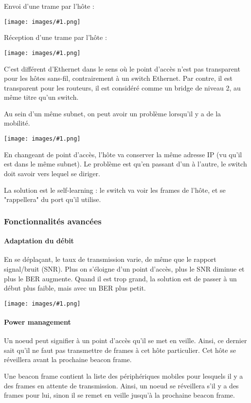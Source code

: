 \documentclass[10pt,a4paper]{report}
\newcommand{\dessin}[1]{\begin{center}\texttt{[image: images/\#1.png]}\end{center}}
\newcommand{\dessinS}[2]{\begin{center}\texttt{[image: images/\#1.png]}\end{center}}
\begin{document}
		
		Envoi d'une trame par l'hôte :
		
		\dessin{39}
		
		Réception d'une trame par l'hôte :
		
		\dessin{40}
		
		C'est différent d'Ethernet dans le sens où le point d'accès n'est pas transparent pour les hôtes sans-fil, contrairement à un switch Ethernet. Par contre, il est transparent pour les routeurs, il est considéré comme un bridge de niveau 2, au même titre qu'un switch.
		
		Au sein d'un même subnet, on peut avoir un problème lorsqu'il y a de la mobilité.
		
		\dessinS{42}{.7}
				
		En changeant de point d'accès, l'hôte va conserver la même adresse IP (vu qu'il est dans le même subnet). Le problème est qu'en passant d'un à l'autre, le switch doit savoir vers lequel se diriger.
		
		La solution est le self-learning : le switch va voir les frames de l'hôte, et se "rappellera" du port qu'il utilise.
		
			\subsubsection{Fonctionnalités avancées}
		
			\paragraph{Adaptation du débit}
			En se déplaçant, le taux de transmission varie, de même que le rapport signal/bruit (SNR). Plus on s'éloigne d'un point d'accès, plus le SNR diminue et plus le BER augmente. Quand il est trop grand, la solution est de passer à un début plus faible, mais avec un BER plus petit.
		
			\dessinS{29}{.7}
		
			\paragraph{Power management}
		
			Un noeud peut signifier à un point d'accès qu'il se met en veille. Ainsi, ce dernier sait qu'il ne faut pas transmettre de frames à cet hôte particulier. Cet hôte se réveillera avant la prochaine beacon frame.
		
			Une beacon frame contient la liste des périphériques mobiles pour lesquels il y a des frames en attente de transmission. Ainsi, un noeud se réveillera s'il y a des frames pour lui, sinon il se remet en veille jusqu'à la prochaine beacon frame.
		
\end{document}
